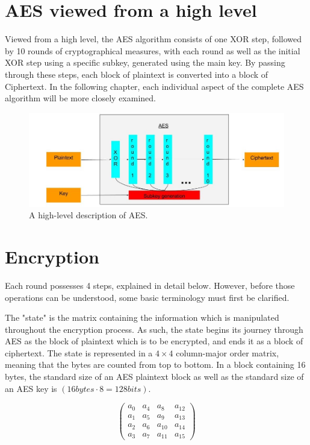 \documentclass[12pt]{report}
\theoremstyle{definition}
\theoremstyle{remark}
\begin{document}
\section{AES viewed from a high level}

Viewed from a high level, the AES algorithm consists of one XOR step, followed by 10 rounds of cryptographical measures, with each round as well as the initial XOR step using a specific subkey, generated using the main key. By passing through these steps, each block of plaintext is converted into a block of Ciphertext. In the following chapter, each individual aspect of the complete AES algorithm will be more closely examined.

\begin{figure}[H]
\centering
\includegraphics[scale=0.4]{AES_fig1.jpg}
\caption{A high-level description of AES.}
\end{figure}

\section{Encryption}
Each round possesses 4 steps, explained in detail below. However, before those operations can be understood, some basic terminology must first be clarified.

The "state" is the matrix containing the information which is manipulated throughout the encryption process. As such, the state begins its journey through AES as the block of plaintext which is to be encrypted, and ends it as a block of ciphertext. The state is represented in a $4 \times 4$ column-major order matrix, meaning that the bytes are counted from top to bottom. In a block containing 16 bytes, the standard size of an AES plaintext block as well as the standard size of  an AES key is $(16 bytes \cdot 8 = 128 bits)$.

\[ \left( \begin{array}{cccc}
a_0 & a_4 & a_8 & a_{12} \\
a_1 & a_5 & a_9 & a_{13} \\
a_2 & a_6 & a_{10} & a_{14} \\
a_3 & a_7 & a_{11} & a_{15}\end{array} \right)\] 
\end{document}
